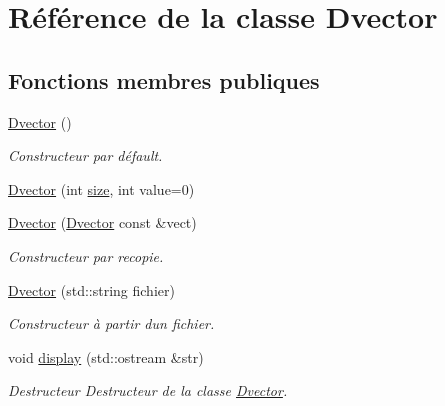\hypertarget{class_dvector}{}\section{Référence de la classe Dvector}
\label{class_dvector}
\subsection*{Fonctions membres publiques}
\begin{DoxyCompactItemize}
\item 
\mbox{\label{class_dvector_adf0f620df0feef3311f7d198e649a298}} 
\hyperlink{class_dvector_adf0f620df0feef3311f7d198e649a298}{Dvector} ()
\begin{DoxyCompactList}\small\item\em Constructeur par défault. \end{DoxyCompactList}\item 
\hyperlink{class_dvector_a8a4feb509178ccc26a7d3805548fab17}{Dvector} (int \hyperlink{class_dvector_adda9654f389de24c744e897e93f850fb}{size}, int value=0)
\item 
\hyperlink{class_dvector_aa3a4f95e9bfe8139537593f86640d3af}{Dvector} (\hyperlink{class_dvector}{Dvector} const \&vect)
\begin{DoxyCompactList}\small\item\em Constructeur par recopie. \end{DoxyCompactList}\item 
\mbox{\label{class_dvector_a2f2c20eb463fe2fd695493b5d6871244}} 
\hyperlink{class_dvector_a2f2c20eb463fe2fd695493b5d6871244}{Dvector} (std\+::string fichier)
\begin{DoxyCompactList}\small\item\em Constructeur à partir d\textquotesingle{}un fichier. \end{DoxyCompactList}\item 
\mbox{\label{class_dvector_af66e4bdf60171463c01eea1039eecdb1}} 
void \hyperlink{class_dvector_af66e4bdf60171463c01eea1039eecdb1}{display} (std\+::ostream \&str)
\begin{DoxyCompactList}\small\item\em Destructeur Destructeur de la classe \hyperlink{class_dvector}{Dvector}. \end{DoxyCompactList}\item 

\end{DoxyCompactItemize}
